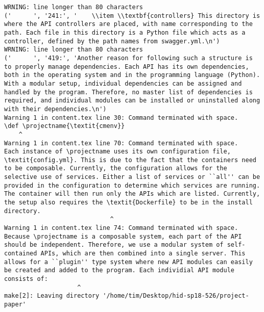 \begin{tiny}
\begin{verbatim}
WRNING: line longer than 80 characters
('      ', '241:', '    \\item \\textbf{controllers} This directory is where the API controllers are placed, with name corresponding to the path. Each file in this directory is a Python file which acts as a controller, defined by the path names from swagger.yml.\n')
WRNING: line longer than 80 characters
('      ', '419:', 'Another reason for following such a structure is to properly manage dependencies. Each API has its own dependencies, both in the operating system and in the programming language (Python). With a modular setup, individual dependencies can be assigned and handled by the program. Therefore, no master list of dependencies is required, and individual modules can be installed or uninstalled along with their dependencies.\n')
Warning 1 in content.tex line 30: Command terminated with space.
\def \projectname{\textit{cmenv}}  
    ^
Warning 1 in content.tex line 70: Command terminated with space.
Each instance of \projectname uses its own configuration file, \textit{config.yml}. This is due to the fact that the containers need to be composable. Currently, the configuration allows for the selective use of services. Either a list of services or ``all'' can be provided in the configuration to determine which services are running. The container will then run only the APIs which are listed. Currently, the setup also requires the \textit{Dockerfile} to be in the install directory.  
                             ^
Warning 1 in content.tex line 74: Command terminated with space.
Because \projectname is a composable system, each part of the API should be independent. Therefore, we use a modular system of self-contained APIs, which are then combined into a single server. This allows for a ``plugin'' type system where new API modules can easily be created and added to the program. Each individial API module consists of:  
                    ^
make[2]: Leaving directory '/home/tim/Desktop/hid-sp18-526/project-paper'
\end{verbatim}
\end{tiny}
